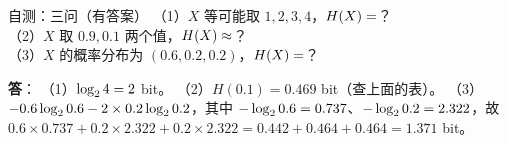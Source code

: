 \begin{qa}{自测：三问（有答案）}
（1）$X$ 等可能取 $1,2,3,4$，$H\!\left(X\right)=$？\\
（2）$X$ 取 $0.9,0.1$ 两个值，$H\!\left(X\right)\approx$？\\
（3）$X$ 的概率分布为 $(0.6,0.2,0.2)$，$H\!\left(X\right)=$？

\textbf{答}：
（1）$\log_{2}4=2$ bit。
（2）$H(0.1)=0.469$ bit（查上面的表）。
（3）$-0.6\log_{2}0.6-2\times0.2\log_{2}0.2$，其中 $-\log_{2}0.6=0.737$、$-\log_{2}0.2=2.322$，故
$0.6\times0.737+0.2\times2.322+0.2\times2.322=0.442+0.464+0.464=1.371$ bit。
\end{qa}
